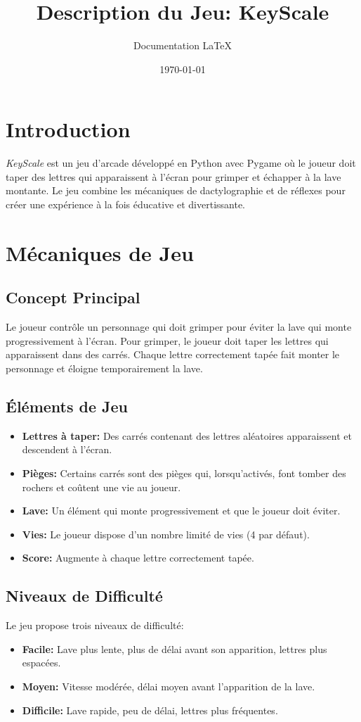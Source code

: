 \documentclass{article}
\title{Description du Jeu: KeyScale}
\author{Documentation LaTeX}
\date{\today}
\begin{document}
\maketitle

\section{Introduction}
\textit{KeyScale} est un jeu d'arcade développé en Python avec Pygame où le joueur doit taper des lettres qui apparaissent à l'écran pour grimper et échapper à la lave montante. Le jeu combine les mécaniques de dactylographie et de réflexes pour créer une expérience à la fois éducative et divertissante.

\section{Mécaniques de Jeu}

\subsection{Concept Principal}
Le joueur contrôle un personnage qui doit grimper pour éviter la lave qui monte progressivement à l'écran. Pour grimper, le joueur doit taper les lettres qui apparaissent dans des carrés. Chaque lettre correctement tapée fait monter le personnage et éloigne temporairement la lave.

\subsection{Éléments de Jeu}
\begin{itemize}
    \item \textbf{Lettres à taper:} Des carrés contenant des lettres aléatoires apparaissent et descendent à l'écran.
    \item \textbf{Pièges:} Certains carrés sont des pièges qui, lorsqu'activés, font tomber des rochers et coûtent une vie au joueur.
    \item \textbf{Lave:} Un élément qui monte progressivement et que le joueur doit éviter.
    \item \textbf{Vies:} Le joueur dispose d'un nombre limité de vies (4 par défaut).
    \item \textbf{Score:} Augmente à chaque lettre correctement tapée.
\end{itemize}

\subsection{Niveaux de Difficulté}
Le jeu propose trois niveaux de difficulté:
\begin{itemize}
    \item \textbf{Facile:} Lave plus lente, plus de délai avant son apparition, lettres plus espacées.
    \item \textbf{Moyen:} Vitesse modérée, délai moyen avant l'apparition de la lave.
    \item \textbf{Difficile:} Lave rapide, peu de délai, lettres plus fréquentes.
\end{itemize}
\end{document}
